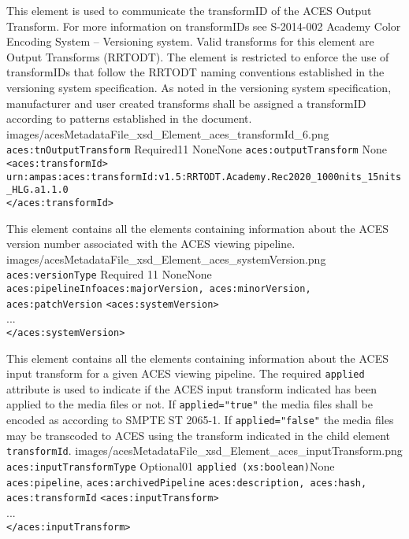         {This element is used to communicate the transformID of the ACES Output Transform.  For more information on transformIDs see S-2014-002 Academy Color Encoding System -- Versioning system.  Valid transforms for this element are Output Transforms (RRTODT).  The element is restricted to enforce the use of transformIDs that follow the RRTODT naming conventions established in the versioning system specification.  As noted in the versioning system specification, manufacturer and user created transforms shall be assigned a transformID according to patterns established in the document.}
        {images/acesMetadataFile_xsd_Element_aces_transformId_6.png}
        {\texttt{aces:tnOutputTransform}}
        {Required}{1}{1}
        {None}{None}
        {\texttt{aces:outputTransform}}
        {None}
        {\lstinline{<aces:transformId>}\\
        \lstinline{urn:ampas:aces:transformId:v1.5:RRTODT.Academy.Rec2020_1000nits_15nits_HLG.a1.1.0}\\
        \lstinline{</aces:transformId>}}

        {This element contains all the elements containing information about the ACES version number associated with the ACES viewing pipeline.}
        {images/acesMetadataFile_xsd_Element_aces_systemVersion.png}
        {\texttt{aces:versionType}}
        {Required}
        {1}{1}
        {None}{None}
        {\texttt{aces:pipelineInfo}}{\texttt{aces:majorVersion, aces:minorVersion, aces:patchVersion}}
        {\lstinline{<aces:systemVersion>} \\
        ... \\
        \lstinline{</aces:systemVersion>}}

        {This element contains all the elements containing information about the ACES input transform for a given ACES viewing pipeline.  The required \texttt{applied} attribute is used to indicate if the ACES input transform indicated has been applied to the media files or not.  If \texttt{applied="true"} the media files shall be encoded as according to SMPTE ST 2065-1. If \texttt{applied="false"} the media files may be transcoded to ACES using the transform indicated in the child element \texttt{transformId}.}
        {images/acesMetadataFile_xsd_Element_aces_inputTransform.png}
        {\texttt{aces:inputTransformType}}
        {Optional}{0}{1}
        {\texttt{applied (xs:boolean)}}{None}
        {\texttt{aces:pipeline}, \texttt{aces:archivedPipeline}}
        {\texttt{aces:description, aces:hash, aces:transformId}}
        {\lstinline{<aces:inputTransform>} \\
        ... \\
        \lstinline{</aces:inputTransform>}}

